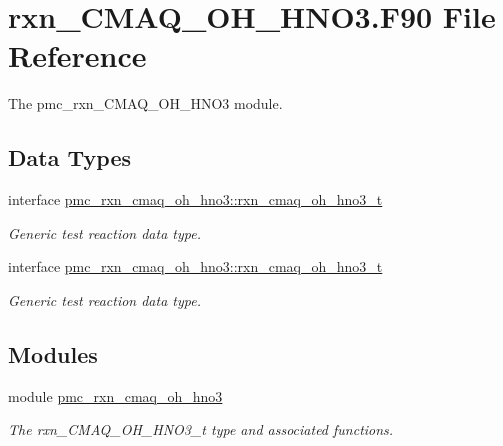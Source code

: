 \hypertarget{rxn___c_m_a_q___o_h___h_n_o3_8_f90}{}\section{rxn\+\_\+\+C\+M\+A\+Q\+\_\+\+O\+H\+\_\+\+H\+N\+O3.\+F90 File Reference}
\label{rxn___c_m_a_q___o_h___h_n_o3_8_f90}


The pmc\+\_\+rxn\+\_\+\+C\+M\+A\+Q\+\_\+\+O\+H\+\_\+\+H\+N\+O3 module.  


\subsection*{Data Types}
\begin{DoxyCompactItemize}
\item 
interface \mbox{\hyperlink{structpmc__rxn__cmaq__oh__hno3_1_1rxn__cmaq__oh__hno3__t}{pmc\+\_\+rxn\+\_\+cmaq\+\_\+oh\+\_\+hno3\+::rxn\+\_\+cmaq\+\_\+oh\+\_\+hno3\+\_\+t}}
\begin{DoxyCompactList}\small\item\em Generic test reaction data type. \end{DoxyCompactList}\item 
interface \mbox{\hyperlink{structpmc__rxn__cmaq__oh__hno3_1_1rxn__cmaq__oh__hno3__t}{pmc\+\_\+rxn\+\_\+cmaq\+\_\+oh\+\_\+hno3\+::rxn\+\_\+cmaq\+\_\+oh\+\_\+hno3\+\_\+t}}
\begin{DoxyCompactList}\small\item\em Generic test reaction data type. \end{DoxyCompactList}\end{DoxyCompactItemize}
\subsection*{Modules}
\begin{DoxyCompactItemize}
\item 
module \mbox{\hyperlink{namespacepmc__rxn__cmaq__oh__hno3}{pmc\+\_\+rxn\+\_\+cmaq\+\_\+oh\+\_\+hno3}}
\begin{DoxyCompactList}\small\item\em The rxn\+\_\+\+C\+M\+A\+Q\+\_\+\+O\+H\+\_\+\+H\+N\+O3\+\_\+t type and associated functions. \end{DoxyCompactList}\end{DoxyCompactItemize}
